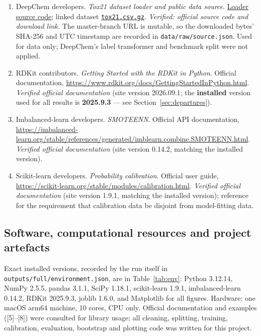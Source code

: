 \documentclass[10pt,letterpaper]{article}
\begin{document}
\begin{enumerate}
\item DeepChem developers. \emph{Tox21 dataset loader and public data source}.
\href{https://raw.githubusercontent.com/deepchem/deepchem/master/deepchem/molnet/load_function/tox21_datasets.py}{Loader
source code}; linked dataset
\href{https://deepchemdata.s3-us-west-1.amazonaws.com/datasets/tox21.csv.gz}{\texttt{tox21.csv.gz}}.
\emph{Verified: official source code and download link.} The master-branch URL is mutable, so the
downloaded bytes' SHA-256 and UTC timestamp are recorded in \texttt{data/raw/source.json}. Used for
data only; DeepChem's label transformer and benchmark split were not applied.

\item RDKit contributors. \emph{Getting Started with the RDKit in Python}. Official documentation,
\url{https://www.rdkit.org/docs/GettingStartedInPython.html}. \emph{Verified official documentation}
(site version 2026.09.1; the \textbf{installed} version used for all results is \textbf{2025.9.3} ---
see Section~\ref{sec:departures}).

\item Imbalanced-learn developers. \emph{SMOTEENN}. Official API documentation,
\url{https://imbalanced-learn.org/stable/references/generated/imblearn.combine.SMOTEENN.html}.
\emph{Verified official documentation} (site version 0.14.2, matching the installed version).

\item Scikit-learn developers. \emph{Probability calibration}. Official user guide,
\url{https://scikit-learn.org/stable/modules/calibration.html}. \emph{Verified official
documentation} (site version 1.9.1, matching the installed version); reference for the requirement
that calibration data be disjoint from model-fitting data.
\end{enumerate}

\subsection*{Software, computational resources and project artefacts}

Exact installed versions, recorded by the run itself in \texttt{outputs/full/environment.json}, are
in Table~\ref{tab:env}: Python 3.12.14, NumPy 2.5.5, pandas 3.1.1, SciPy 1.18.1, scikit-learn 1.9.1,
imbalanced-learn 0.14.2, RDKit 2025.9.3, joblib 1.6.0, and Matplotlib for all figures. Hardware: one
macOS arm64 machine, 10 cores, CPU only. Official documentation and examples ([5]--[8]) were
consulted for library usage; all cleaning, splitting, training, calibration, evaluation, bootstrap
and plotting code was written for this project.
\end{document}
